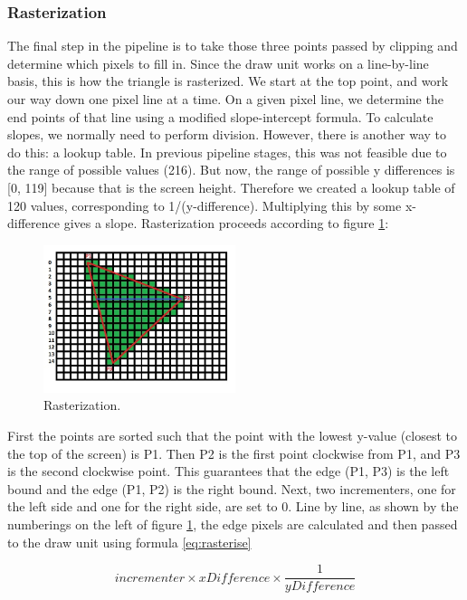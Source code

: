\documentclass[onecolumn]{IEEEtran}
\begin{document}
\subsubsection{Rasterization}
The final step in the pipeline is to take those three points passed by clipping and determine which pixels to fill in.  Since the draw unit works on a line-by-line basis, this is how the triangle is rasterized.  We start at the top point, and work our way down one pixel line at a time.  On a given pixel line, we determine the end points of that line using a modified slope-intercept formula.  To calculate slopes, we normally need to perform division.  However, there is another way to do this: a lookup table.  In previous pipeline stages, this was not feasible due to the range of possible values (216).  But now, the range of possible y differences is [0, 119] because that is the screen height.  Therefore we created a lookup table of 120 values, corresponding to 1/(y-difference).  Multiplying this by some x-difference gives a slope.  Rasterization proceeds according to figure \ref{fig:rasteriser}:

\begin{figure}[H]
	\centering
	\includegraphics[width=0.5\textwidth]{rasteriser.png}
	\caption{Rasterization.}
	\label{fig:rasteriser}
\end{figure}

First the points are sorted such that the point with the lowest y-value (closest to the top of the screen) is P1.  Then P2 is the first point clockwise from P1, and P3 is the second clockwise point.  This guarantees that the edge (P1, P3) is the left bound and the edge (P1, P2) is the right bound.  Next, two incrementers, one for the left side and one for the right side, are set to 0.  Line by line, as shown by the numberings on the left of figure \ref{fig:rasteriser}, the edge pixels are calculated and then passed to the draw unit using formula \ref{eq:rasterise}

\begin{equation}
	\label{eq:rasterise}
	incrementer \times xDifference \times \frac{1}{yDifference}  
\end{equation}
\end{document}
